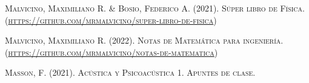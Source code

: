 \documentclass[a5paper,12pt,twoside]{book}
\begin{document}
\begin{comment}
\section{Método de Delany-Bazley}

Consiste en un método para calcular la impedancia equivalente que tendría un tubo con material absorbente dentro.

Una onda se propaga en un tubo que tiene material absorbente en uno de sus extremos, como se muestra en el siguiente esquema.

\begin{center}
    \def\svgwidth{0.8\linewidth}
    
\end{center}

La impedancia equivalente del otro extremo está dada por:
\begin{equation*}
    \sub{Z}{in} = \frac{Z_s \cos(kL-kD) + Z_0 \, \iu \sin (kL-kD)}{Z_0 \cos(kL-kD) + Z_s \, \iu \sin (kL-kD)}
\end{equation*}

Si el Side Branch es cerrado:
\begin{equation*}
    \sub{Z}{in} = \frac{Z_0}{\iu \tan (kL)} \propto \frac{\lambda}{L}
\end{equation*}

Si el Side Branch es abierto:
\begin{equation*}
    \sub{Z}{in} = Z_0 \, \iu \tan (kL) \propto \frac{L}{\lambda}
\end{equation*}

Sean $\Phi$ la porosidad y $\sigma$ el trabajo del aire para pasar se tiene:
\begin{gather*}
    Z_e = Z_0 \left[ 1 + 0.0571 \, X^{-0.754} - \iu \, 0.087 \, X^{-0.732} \right]
    \\
    k_e = \frac{\omega}{c} \left[ 1 + 0.0978 \, X^{-0.7} - \iu \, 0.189 \, X^{-0.595} \right]
\end{gather*}

Donde:
\begin{equation*}
    X = \frac{\rho_0 \, f}{\sigma}
\end{equation*}

Quedando la impedancia dada por:
\begin{equation*}
    Z_s = \frac{Z_e}{\Phi \, \iu \tan (k_e \, D)}
\end{equation*}
\end{comment}

\begin{thebibliography}{3}
     \textsc{Malvicino, Maximiliano R. \& Bosio, Federico A. (2021). Súper libro de Física. \\ (\url{https://github.com/mrmalvicino/super-libro-de-fisica}})
    
     \textsc{Malvicino, Maximiliano R. (2022). Notas de Matemática para ingeniería. \\
    (\url{https://github.com/mrmalvicino/notas-de-matematica}})
    
     \textsc{Masson, F. (2021). Acústica y Psicoacústica 1. Apuntes de clase.}
\end{thebibliography}
\end{document}
